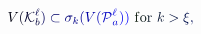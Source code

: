 \documentclass[12pt]{article}
\begin{document}
\makeatletter
\renewcommand*{\@textcolor}[3]{%
  \protect\leavevmode
  \begingroup
    \color#1{#2}#3%
  \endgroup
}
\makeatother
\begin{displaymath}
\mathcolor[RGB]{0,0,15}{V} \mathcolor[RGB]{0,0,30}{(} \mathcal { \mathcolor[RGB]{0,0,45}{K} } _ { \mathcolor[RGB]{0,0,60}{b} } ^ { \mathcolor[RGB]{0,0,75}{\ell} } \mathcolor[RGB]{0,0,90}{)} \mathcolor[RGB]{0,0,105}{\subset} \mathcolor[RGB]{0,0,120}{\sigma} _ { \mathcolor[RGB]{0,0,135}{k} } \mathcolor[RGB]{0,0,150}{(} \mathcolor[RGB]{0,0,165}{V} \mathcolor[RGB]{0,0,180}{(} \mathcal { \mathcolor[RGB]{0,0,195}{P} } _ { \mathcolor[RGB]{0,0,210}{a} } ^ { \mathcolor[RGB]{0,0,225}{\ell} } \mathcolor[RGB]{0,0,240}{)} \mathcolor[RGB]{0,0,255}{)} \mathrm { ~ \mathcolor[RGB]{0,15,0}{f} \mathcolor[RGB]{0,15,15}{o} \mathcolor[RGB]{0,15,30}{r} ~ } \mathcolor[RGB]{0,15,45}{k} \mathcolor[RGB]{0,15,60}{>} \mathcolor[RGB]{0,15,75}{\xi} \mathcolor[RGB]{0,15,90}{,}
\end{displaymath}
\end{document}

